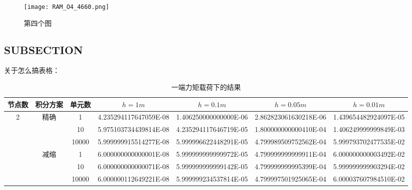 \documentclass[UTF8,zihao=5]{ctexart} %
\begin{document}
\begin{figure}[H]
    \centering
    \texttt{[image: RAM\_O4\_4660.png]}  %
    \label{fig:c}
    \caption{第四个图}
\end{figure}



\subsection{SUBSECTION}

关于怎么搞表格：

\begin{table*}[htbp]
    \footnotesize
    \begin{center}
        \caption{一端力矩载荷下的结果\fontsize{0pt}{2em}} %
        \label{表2}
        \begin{tabular}{|c|c|c|c|c|c|c|}
            \hline
            节点数                              & 积分方案              & 单元数                & $h=1m$                & $h=0.1m$              & $h=0.05m$             & $h=0.01m$             \\
            \hline
            \multirow{6}{*}{2}                  & \multirow{3}{*}{精确} & 1                     & 4.235294117647059E-08 & 1.406250000000000E-06 & 2.862823061630218E-06 & 1.439654482924097E-05 \\
            \cline{3-7}
                                                &                       & 10                    & 5.975103734439814E-08 & 4.235294117646719E-05 & 1.800000000000410E-04 & 1.406249999999849E-03 \\
            \cline{3-7}
                                                &                       &
            10000                               & 5.999999915514277E-08 & 5.999996622448291E-05 & 4.799989509752562E-04 & 5.999793702477535E-02                                                 \\
            \cline{2-7}
                                                & \multirow{3}{*}{减缩} & 1                     & 6.000000000000001E-08 & 5.999999999999972E-05 & 4.799999999999911E-04 & 6.000000000003492E-02 \\
            \cline{3-7}
                                                &                       & 10                    & 6.000000000000071E-08 & 5.999999999999142E-05 & 4.799999999995399E-04 & 5.999999999903294E-02 \\
            \cline{3-7}
                                                &                       & 10000                 & 6.000000112649221E-08 & 5.999999234537814E-05 & 4.799997501925065E-04 & 6.000037607984510E-02 \\
            \hline


\end{tabular}
\end{center}
\end{table*}
\end{document}
